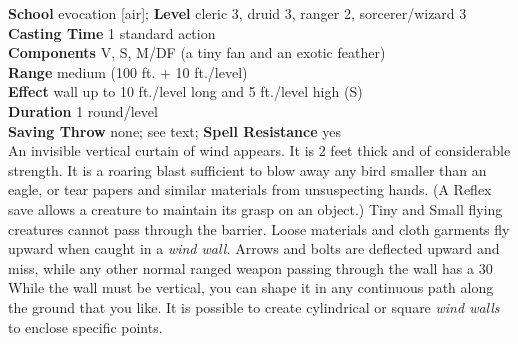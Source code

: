 \textbf{School} evocation [air]; \textbf{Level} cleric 3, druid 3, ranger 2, sorcerer/wizard 3\\
\textbf{Casting Time} 1 standard action\\
\textbf{Components} V, S, M/DF (a tiny fan and an exotic feather)\\
\textbf{Range }medium (100 ft. + 10 ft./level)\\
\textbf{Effect }wall up to 10 ft./level long and 5 ft./level high (S)\\
\textbf{Duration} 1 round/level\\
\textbf{Saving Throw} none; see text; \textbf{Spell Resistance} yes\\
An invisible vertical curtain of wind appears. It is 2 feet thick and of considerable strength. It is a roaring blast sufficient to blow away any bird smaller than an eagle, or tear papers and similar materials from unsuspecting hands. (A Reflex save allows a creature to maintain its grasp on an object.) Tiny and Small flying creatures cannot pass through the barrier. Loose materials and cloth garments fly upward when caught in a \textit{wind wall. }Arrows and bolts are deflected upward and miss, while any other normal ranged weapon passing through the wall has a 30%
While the wall must be vertical, you can shape it in any continuous path along the ground that you like. It is possible to create cylindrical or square \textit{wind walls} to enclose specific points. \\
